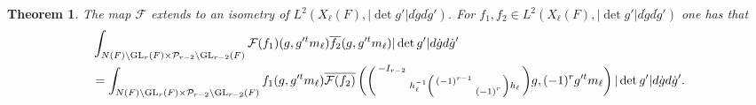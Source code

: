 \documentclass[12pt]{amsart}
\newtheorem{thm}{Theorem}[section]
\theoremstyle{remark}
\numberwithin{equation}{section}
\newcommand{\GL}{\mathrm{GL}}
\theoremstyle{definition}
\newenvironment{psmatrix}
  {\left(\begin{smallmatrix}}
  {\end{smallmatrix}\right)}
\numberwithin{equation}{subsection}
\begin{document}
\begin{thm}\label{thm:L2ext}
    The map $\mathcal{F}$ extends to an isometry of $L^2\left(X_{\ell}(F), |\det g'|d\dot{g}d\dot{g}'\right)$. For $f_1,f_2 \in L^2\left(X_{\ell}(F), |\det g'|d\dot{g}d\dot{g}'\right)$ one has that
    \begin{align*}
        &\int_{N(F)\backslash\GL_r(F)\times \mathcal{P}_{r-2}\backslash \GL_{r-2}(F)} \mathcal{F}(f_1)(g,g'^tm_{\ell})\overline{f_2}(g,g'^tm_{\ell})|\det g'|d\dot{g}d\dot{g}'\\
        &= \int_{N(F)\backslash\GL_r(F)\times \mathcal{P}_{r-2}\backslash \GL_{r-2}(F)} f_1(g,g'^tm_{\ell})\overline{\mathcal{F}(f_2)}\left(\begin{psmatrix} -I_{r-2}& \\ & h_\ell^{-1} \begin{psmatrix} (-1)^{r-1} &\\ & (-1)^{r}\end{psmatrix} h_\ell  \end{psmatrix}g,(-1)^{r}g'^tm_{\ell}\right)|\det g'|d\dot{g}d\dot{g}'.
    \end{align*}
\end{thm}
\end{document}
